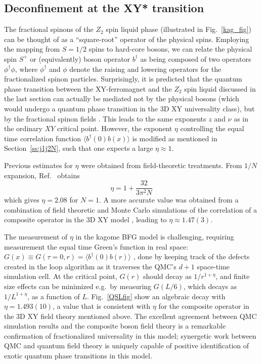 \documentclass[range]{ar2e}
\begin{document}
\subsection{Deconfinement at the XY* transition} \label{XYstar}

The fractional spinons of the $Z_2$ spin liquid phase (illustrated in Fig.~\ref{kag_fig}) can be thought of as a ``square-root'' operator of the physical spins.  Employing the mapping from $S=1/2$ spins to hard-core bosons, we can relate the physical spin $S^+$ or (equivalently) boson operator $b^{\dagger}$ as being composed of two operators  $\phi^\dagger \phi$, where $\phi^\dagger$ and $\phi$ denote the raising and lowering operators for the fractionalized spinon particles.  
Surprisingly, it is predicted that the quantum phase transition between the XY-ferromagnet and the $Z_2$ spin liquid discussed in the last section can actually be mediated not by the physical bosons (which would undergo a quantum phase transition in the 3D XY universality class), but by the fractional spinon fields \cite{XYstar1,XYstar2,earlyXYstar}.  This leads to the same exponents $z$ and $\nu$ as in the ordinary $XY$ critical point.  However, the exponent $\eta$ controlling the equal time correlation function $\langle b^\dagger(0) b(x) \rangle$ is modified as mentioned in Section~\ref{ss:j1j2N}, such that one expects a large $\eta \approx 1$.

Previous estimates for $\eta$ were obtained from field-theoretic treatments.  From $1/N$ expansion, Ref.~\cite{XYstar2} obtains
\begin{equation}
\eta = 1 + \frac{32}{3 \pi^2 N}
\end{equation}
which gives $\eta = 2.08$ for $N=1$.
A more accurate value was obtained from a combination of field theoretic and Monte Carlo simulations of the correlation of a composite operator in the 3D XY model \cite{compositefieldtheory,compositeMC}, leading to $\eta\approx  1.47(3)$.

The measurement of $\eta$ in the kagome BFG model is challenging, requiring measurement the equal time Green's function in real space: $G(x)\equiv G(\tau=0,r) = \langle b^\dagger(0) b(r) \rangle$ \cite{WormA,gfsse}, done by keeping track of the defects created in the loop algorithm \cite{Syljuasen02} as it traverses the QMC's $d+1$ space-time simulation cell.  At the critical point, $G(r)$ should decay as $1/r^{1+\eta}$, and finite size effects can be minimized e.g.~by measuring $G(L/6)$, which decays as $1/L^{1+\eta}$, as a function of $L$.  Fig.~\ref{QSLfig} show an algebraic decay with $\eta=1.493(10)$, a value that is consistent with $\eta$ for the composite operator in the 3D XY field theory mentioned above.  The excellent agreement between QMC simulation results and the composite boson field theory is a remarkable confirmation of fractionalized universality in this model; synergetic work between QMC and quantum field theory is uniquely capable of positive identification of exotic quantum phase transitions in this model.
\end{document}
